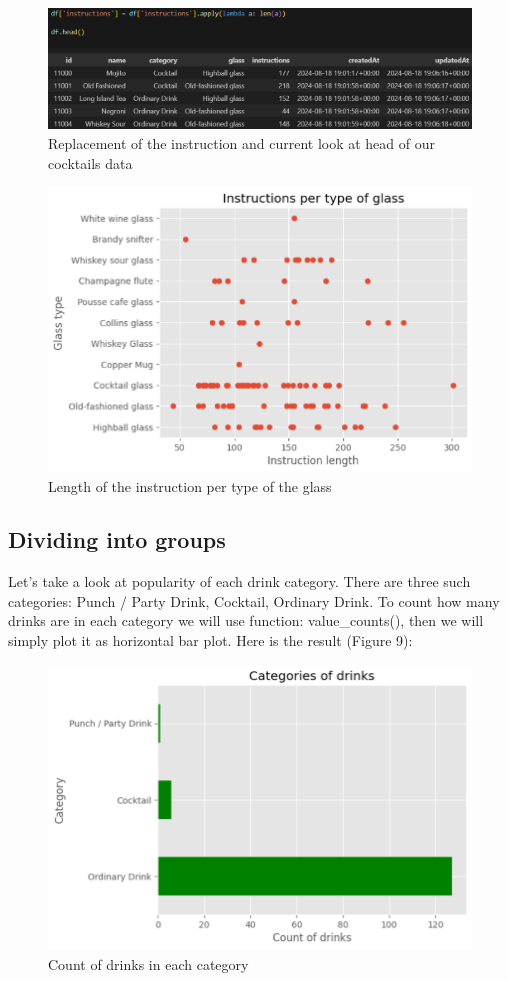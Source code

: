 \documentclass[a4paper]{article}
\begin{document}
\begin{figure}[H]
    \centering
    \includegraphics[width=1\linewidth]{simplify.png}
    \caption{Replacement of the instruction and  current look at head of our cocktails data}
    \label{fig:enter-label}
\end{figure}

\begin{figure}[H]
    \centering
    \includegraphics[width=0.8\linewidth]{ins length.png}
    \caption{Length of the instruction per type of the glass}
    \label{fig:enter-label}
\end{figure}

\subsection{Dividing into groups}
Let's take a look at popularity of each drink category. There are three such categories: Punch / Party Drink, Cocktail, Ordinary Drink. To count how many drinks are in each category we will use function: value\_counts(), then we will simply plot it as horizontal bar plot. Here is the result (Figure 9):

\begin{figure}[H]
    \centering
    \includegraphics[width=0.7\linewidth]{categories.png}
    \caption{Count of drinks in each category}
    \label{fig:enter-label}
\end{figure}
\end{document}
